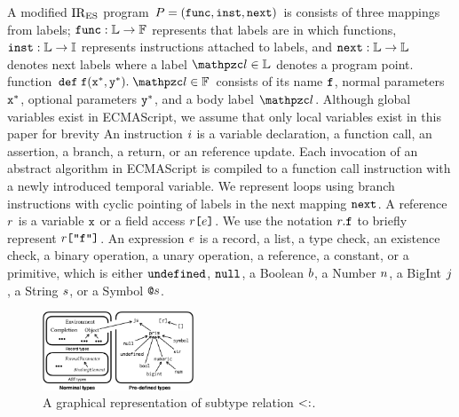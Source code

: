 A modified ${\text{IR}_\text{ES}}$ program $P = (\mathtt{func}, \mathtt{inst}, \mathtt{next})$ is consists
of three mappings from labels;  $\mathtt{func}: \mathbb{L} \rightarrow \mathbb{F}$
represents that labels are in which functions, $\mathtt{inst}: \mathbb{L} \rightarrow
\mathbb{I}$ represents instructions attached to labels, and $\mathtt{next}: \mathbb{L}
\rightarrow \mathbb{L}$ denotes next labels where a label $\lab \in \labset$
denotes a program point.  function $\kwdef \; \f (\x^*, \y^*). \; \lab \in
\funcset$ consists of its name $\texttt{f}$, normal parameters $\texttt{x}^*$, optional
parameters $\texttt{y}^*$, and a body label $\lab$.  Although global variables exist in
ECMAScript, we assume that only local variables exist in this paper for brevity
An instruction $i$ is a variable declaration, a function call, an assertion,
a branch, a return, or an reference update.  Each invocation of an abstract
algorithm in ECMAScript is compiled to a function call instruction with a newly
introduced temporal variable.  We represent loops using branch instructions with
cyclic pointing of labels in the next mapping $\mathtt{next}$.  A reference $r$
is a variable $\texttt{x}$ or a field access $r \texttt{[} e \texttt{]}$.  We use the
notation $r.\texttt{f}$ to briefly represent $r \texttt{[} \texttt{"f"} \texttt{]}$. An
expression $e$ is a record, a list, a type check, an existence check, a
binary operation, a unary operation, a reference, a constant, or a primitive,
which is either $\texttt{undefined}$, $\texttt{null}$, a Boolean $b$, a Number $n$, a
BigInt $j$, a String $s$, or a Symbol $\texttt{@}s$.

\begin{figure}
  \centering
  \includegraphics[width=0.4\textwidth]{img/subtype}
  \vspace*{-1.5em}
  \caption{A graphical representation of subtype relation $<:$.}
  \label{fig:subtype}
  \vspace*{-1.5em}
\end{figure}

